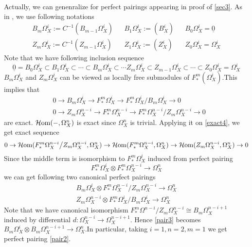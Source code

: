 Actually, we can genenralize for perfect pairings appearing in proof of \ref{sec3}. As in \cite{}, we use following notations
\begin{align}
	B_{m} \Omega^i_X := C^{-1}(B_{m-1} \Omega^i_X) & & B_1 \Omega^i_X :=(B_X^i) & & B_0 \Omega^i_X = \underline{0} \\
	Z_{m} \Omega^i_X := C^{-1}(Z_{m-1} \Omega^i_X) & & Z_1 \Omega^i_X :=(Z_X^i)& & Z_0 \Omega^i_X = \Omega^i_X
\end{align}
Note that we have following inclusion sequence
\begin{equation}
\underline{0}= B_0 \Omega^i_X \subset B_1 \Omega^i_X \subset \cdots \subset B_m \Omega^i_X \subset \cdots Z_m \Omega^i_X \subset Z_{m-1} \Omega^i_X \subset \cdots \subset Z_0 \Omega^i_X = \Omega^i_X
\end{equation}
$B_{m} \Omega^i_X $ and $Z_{m} \Omega^i_X$ can be viewed as locally free submodules of $F^m_*(\Omega^i_X)$.This implies that 
\begin{align}
&0 \to B_m \Omega^i_X \to F^m_* \Omega^i_X \to F_* ^m \Omega^i_X \big/ B_m \Omega^i_X \to 0 \\
\label{exact4}&0 \to Z_m \Omega^{n-i}_X \to F^m_* \Omega^{n-i}_X \to F^m_* \Omega^{n-i}_X \big/Z_m \Omega^{n-i}_X \to 0
\end{align}
are exact. $\operatorname{\mathcal{H}om} (-,\Omega^n_X)$ is exact since $\Omega^n_X$ is trivial. Applying it on \ref{exact4}, we get exact sequence 
\begin{equation}
0 \to \operatorname{\mathcal{H}om} (F^m_* \Omega^{n-i}_X\big/ Z_m \Omega^{n-i}_X , \Omega^n_X) \to \operatorname{\mathcal{H}om}(F^m_* \Omega_X^{n-i}, \Omega^n_X) \to \operatorname{\mathcal{H}om}(Z_m \Omega^{n-i}_X , \Omega^n_X) \to 0
\end{equation}
Since the middle term is isomorphism to $F_*^m \Omega^i_X$ induced from perfect pairing 
\begin{equation}
F_*^m \Omega^i_X \otimes F_*^m \Omega^{n-i}_X \to \Omega_X^n
\end{equation}
we can get following two canonical perfect pairings
\begin{align}
\label{pair3} B_m \Omega^i_X \otimes F_*^m \Omega_X^{n-i}\big/Z_m \Omega^{n-i}_X \to \Omega_X^n \\
Z_m \Omega_X^{n-i} \otimes F^m_* \Omega_X^i \big/ B_m \Omega^i_X \to \Omega^n_X
\end{align}
Note that we have canonical isomorphism $F^m_* \Omega^{n-i}\big/ Z_m \Omega^{n-i}_X \cong B_m \Omega_X^{n-i+1}$ induced by differential $d: \Omega_X^{n-i} \to \Omega_X^{n-i+1}$. Hence \ref{pair3} becomes $B_m \Omega_X^i \otimes B_m \Omega_X^{n-i+1} \to \Omega^n_X$.In particular, taking $i=1, n=2, m=1$ we get perfect pairing \ref{pair2}.

